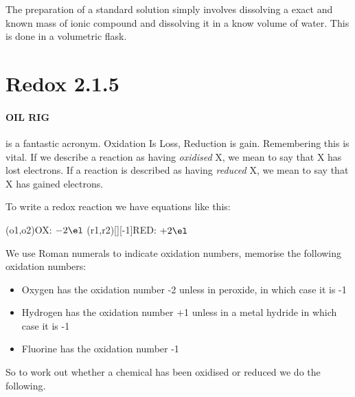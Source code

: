 	The preparation of a standard solution simply involves dissolving a exact and known mass of ionic compound and dissolving it in a know volume of water. This is done in a volumetric flask.
	
\section{Redox 2.1.5}

	\paragraph{OIL RIG} is a fantastic acronym. Oxidation Is Loss, Reduction is gain. Remembering this is vital. If we describe a reaction as having \textit{oxidised} X, we mean to say that X has lost electrons. If a reaction is described as having \textit{reduced} X, we mean to say that X has gained electrons.
	
	To write a redox reaction we have equations like this:
	\begin{center}
	\vspace{7mm}
	\redox(o1,o2){\small OX: $- 2\el$}
	\redox(r1,r2)[][-1]{\small RED: $+ 2\el$}
	\vspace{7mm}
	\end{center}
	We use Roman numerals to indicate oxidation numbers, memorise the following oxidation numbers:
	\begin{itemize}
		\item Oxygen has the oxidation number -2 unless in peroxide, in which case it is -1
		\item Hydrogen has the oxidation number +1 unless in a metal hydride in which case it is -1
		\item Fluorine has the oxidation number -1
	\end{itemize}
	So to work out whether a chemical has been oxidised or reduced we do the following.
	
